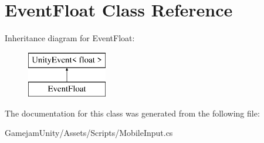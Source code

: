 \hypertarget{class_event_float}{}\section{Event\+Float Class Reference}
\label{class_event_float}
Inheritance diagram for Event\+Float\+:\begin{figure}[H]
\begin{center}
\leavevmode
\includegraphics[height=2.000000cm]{class_event_float}
\end{center}
\end{figure}


The documentation for this class was generated from the following file\+:\begin{DoxyCompactItemize}
\item 
Gamejam\+Unity/\+Assets/\+Scripts/Mobile\+Input.\+cs\end{DoxyCompactItemize}

